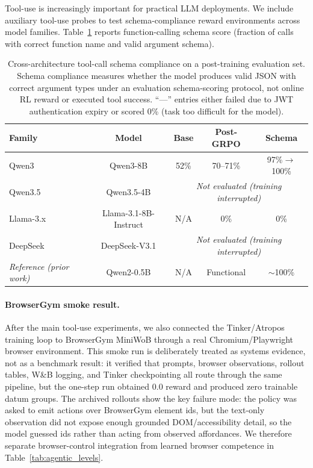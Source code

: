 \documentclass{article}
\begin{document}
Tool-use is increasingly important for practical LLM deployments. We include
auxiliary tool-use probes to test schema-compliance reward environments across
model families.
Table~\ref{tab:tool_use_cross_arch} reports function-calling schema score
(fraction of calls with correct function name and valid argument schema).

\begin{table}[htbp]
\centering
\caption{Cross-architecture tool-call schema compliance on a post-training evaluation set. Schema compliance measures whether the model produces valid JSON with correct argument types under an evaluation schema-scoring protocol, not online RL reward or executed tool success. ``---'' entries either failed due to JWT authentication expiry or scored 0\% (task too difficult for the model).}
\label{tab:tool_use_cross_arch}
\small
\begin{tabular}{@{}lcccc@{}}
\toprule
\textbf{Family} & \textbf{Model} & \textbf{Base} & \textbf{Post-GRPO} & \textbf{Schema} \\
\midrule
Qwen3 & Qwen3-8B & 52\% & 70--71\% & 97\%$\to$100\% \\
Qwen3.5 & Qwen3.5-4B & \multicolumn{3}{c}{\textit{Not evaluated (training interrupted)}} \\
Llama-3.x & Llama-3.1-8B-Instruct & N/A & 0\% & 0\% \\
DeepSeek & DeepSeek-V3.1 & \multicolumn{3}{c}{\textit{Not evaluated (training interrupted)}} \\
\midrule
\textit{Reference (prior work)} & Qwen2-0.5B & N/A & Functional & $\sim$100\% \\
\bottomrule
\end{tabular}
\end{table}

\paragraph{BrowserGym smoke result.}
After the main tool-use experiments, we also connected the Tinker/Atropos
training loop to BrowserGym MiniWoB through a real Chromium/Playwright browser
environment.  This smoke run is deliberately treated as systems evidence, not
as a benchmark result: it verified that prompts, browser observations, rollout
tables, W\&B logging, and Tinker checkpointing all route through the same
pipeline, but the one-step run obtained 0.0 reward and produced zero trainable
datum groups.  The archived rollouts show the key failure mode: the policy was
asked to emit actions over BrowserGym element ids, but the text-only
observation did not expose enough grounded DOM/accessibility detail, so the
model guessed ids rather than acting from observed affordances.  We therefore
separate browser-control integration from learned browser competence in
Table~\ref{tab:agentic_levels}.
\end{document}
